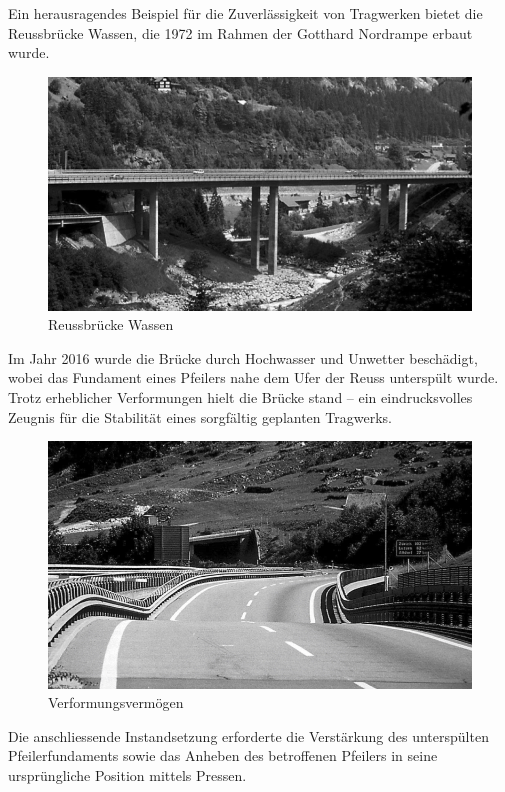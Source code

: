 {Ein herausragendes Beispiel für die Zuverlässigkeit von Tragwerken bietet die Reussbrücke Wassen, die 1972 im Rahmen der Gotthard Nordrampe erbaut wurde. 
\begin{figure} [h]
	\centering
	\includegraphics[width=\textwidth]{papers/balken/images/teil3/ReussbrueckeWassen1.jpg}
	\caption{Reussbrücke Wassen}
	\label{fig:Reussbrücke-Wassen}
\end{figure}
Im Jahr 2016 wurde die Brücke durch Hochwasser und Unwetter beschädigt, wobei das Fundament eines Pfeilers nahe dem Ufer der Reuss unterspült wurde. 
Trotz erheblicher Verformungen hielt die Brücke stand – ein eindrucksvolles Zeugnis für die Stabilität eines sorgfältig geplanten Tragwerks.
\begin{figure}
\begin{center}
\includegraphics[width=\textwidth]{papers/balken/images/teil3/ReussbrueckeWassen2.jpg}
\end{center}
\caption{Verformungsvermögen}
\end{figure}
Die anschliessende Instandsetzung erforderte die Verstärkung des unterspülten Pfeilerfundaments sowie das Anheben des betroffenen Pfeilers in seine ursprüngliche Position mittels Pressen. 
}
